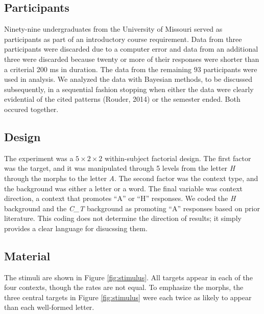 \documentclass[english,floatsintext,man]{apa6}
\begin{document}
\subsection{Participants}\label{participants}

Ninety-nine undergraduates from the University of Missouri served as
participants as part of an introductory course requirement. Data from
three participants were discarded due to a computer error and data from
an additional three were discarded because twenty or more of their
responses were shorter than a criterial 200 ms in duration. The data
from the remaining \(93\) participants were used in analysis. We
analyzed the data with Bayesian methods, to be discussed subsequently,
in a sequential fashion stopping when either the data were clearly
evidential of the cited patterns (Rouder, 2014) or the semester ended.
Both occured together.

\subsection{Design}\label{design}

The experiment was a \(5\times 2 \times 2\) within-subject factorial
design. The first factor was the target, and it was manipulated through
5 levels from the letter \emph{H} through the morphs to the letter
\emph{A}. The second factor was the context type, and the background was
either a letter or a word. The final variable was context direction, a
context that promotes \enquote{A} or \enquote{H} responses. We coded the
\emph{H} background and the \emph{C\_T} background as promoting
\enquote{A} responses based on prior literature. This coding does not
determine the direction of results; it simply provides a clear language
for disucssing them.

\subsection{Material}\label{material}

The stimuli are shown in Figure \ref{fig:stimulus}. All targets appear
in each of the four contexts, though the rates are not equal. To
emphasize the morphs, the three central targets in Figure
\ref{fig:stimulus} were each twice as likely to appear than each
well-formed letter.
\end{document}
